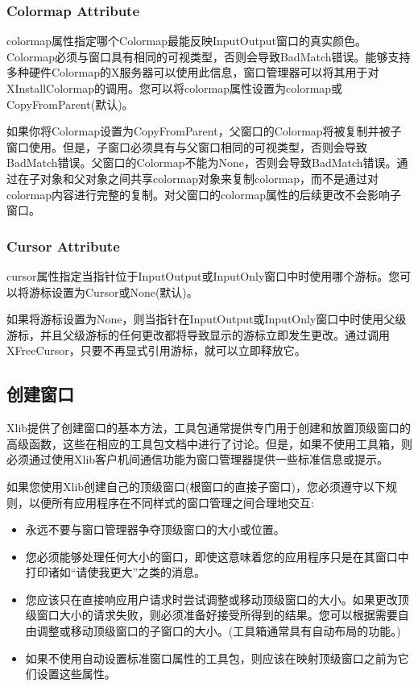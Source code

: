 \subsubsection{Colormap Attribute}

colormap属性指定哪个Colormap最能反映InputOutput窗口的真实颜色。Colormap必须与窗口具有相同的可视类型，否则会导致BadMatch错误。能够支持多种硬件Colormap的X服务器可以使用此信息，窗口管理器可以将其用于对XInstallColormap的调用。您可以将colormap属性设置为colormap或CopyFromParent(默认)。

如果你将Colormap设置为CopyFromParent，父窗口的Colormap将被复制并被子窗口使用。但是，子窗口必须具有与父窗口相同的可视类型，否则会导致BadMatch错误。父窗口的Colormap不能为None，否则会导致BadMatch错误。通过在子对象和父对象之间共享colormap对象来复制colormap，而不是通过对colormap内容进行完整的复制。对父窗口的colormap属性的后续更改不会影响子窗口。

\subsubsection{Cursor Attribute}

cursor属性指定当指针位于InputOutput或InputOnly窗口中时使用哪个游标。您可以将游标设置为Cursor或None(默认)。

如果将游标设置为None，则当指针在InputOutput或InputOnly窗口中时使用父级游标，并且父级游标的任何更改都将导致显示的游标立即发生更改。通过调用XFreeCursor，只要不再显式引用游标，就可以立即释放它。

\subsection{创建窗口}

Xlib提供了创建窗口的基本方法，工具包通常提供专门用于创建和放置顶级窗口的高级函数，这些在相应的工具包文档中进行了讨论。但是，如果不使用工具箱，则必须通过使用Xlib客户机间通信功能为窗口管理器提供一些标准信息或提示。

\noindent 如果您使用Xlib创建自己的顶级窗口(根窗口的直接子窗口)，您必须遵守以下规则，以便所有应用程序在不同样式的窗口管理之间合理地交互:

\begin{itemize}
	\item 永远不要与窗口管理器争夺顶级窗口的大小或位置。
	\item 您必须能够处理任何大小的窗口，即使这意味着您的应用程序只是在其窗口中打印诸如“请使我更大”之类的消息。
	\item 您应该只在直接响应用户请求时尝试调整或移动顶级窗口的大小。如果更改顶级窗口大小的请求失败，则必须准备好接受所得到的结果。您可以根据需要自由调整或移动顶级窗口的子窗口的大小。(工具箱通常具有自动布局的功能。)
	\item 如果不使用自动设置标准窗口属性的工具包，则应该在映射顶级窗口之前为它们设置这些属性。
\end{itemize}

